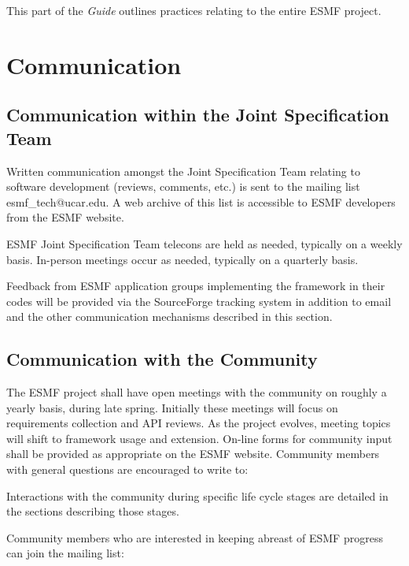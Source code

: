 
This part of the {\it Guide} outlines practices relating to the entire
ESMF project.

\section{Communication}

\subsection{Communication within the Joint Specification Team}
Written communication amongst the Joint Specification Team relating 
to software development (reviews, comments, etc.) is sent to the mailing list 
esmf\_tech@ucar.edu.  A web archive of this list is accessible to
ESMF developers from the ESMF website.

ESMF Joint Specification Team telecons are held as needed, typically 
on a weekly basis.  In-person meetings occur as needed, typically 
on a quarterly basis.

Feedback from ESMF application groups implementing the framework in their
codes will be provided via the SourceForge tracking system in addition
to email and the other communication mechanisms described in this section.

\subsection{Communication with the Community} 
The ESMF project shall have open meetings with the community on roughly a 
yearly basis, during late spring.  Initially these meetings will focus
on requirements collection and API reviews.  As the project evolves,
meeting topics will shift to framework usage and extension.  
On-line forms for community input shall be provided as appropriate on 
the ESMF website.  Community members with general questions 
are encouraged to write to:
\begin{center}
\end{center}
Interactions with the community during specific life cycle stages
are detailed in the sections describing those stages.

Community members who are interested in keeping abreast of ESMF progress
can join the mailing list:
\begin{center}
\end{center}

